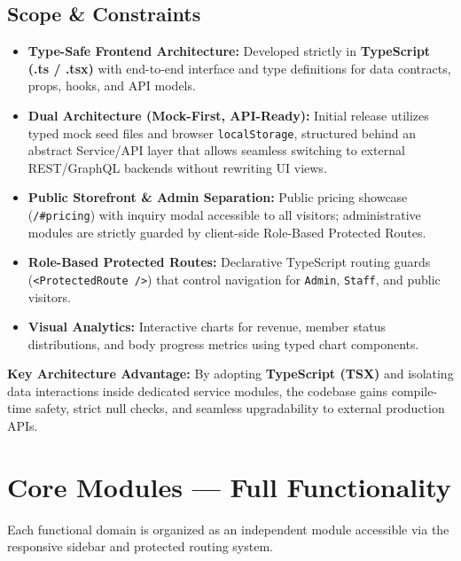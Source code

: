 \documentclass[11pt,a4paper]{article}
\newcommand{\infobox}[1]{%
\begin{tcolorbox}[
    enhanced,
    breakable,
    colback=accentorange!5,
    colframe=accentorange!40,
    boxrule=0.6pt,
    arc=1mm,
    left=10pt, right=10pt, top=8pt, bottom=8pt
]
\small #1
\end{tcolorbox}
\vspace{4pt}
}
\newcommand{\citem}{\item[\textcolor{primaryblue}{\faIcon{check}}]}
\begin{document}
\subsection*{Scope \& Constraints}
\begin{itemize}[leftmargin=*]
  \citem \textbf{Type-Safe Frontend Architecture:} Developed strictly in \textbf{TypeScript (.ts / .tsx)} with end-to-end interface and type definitions for data contracts, props, hooks, and API models.
  \citem \textbf{Dual Architecture (Mock-First, API-Ready):} Initial release utilizes typed mock seed files and browser \texttt{localStorage}, structured behind an abstract Service/API layer that allows seamless switching to external REST/GraphQL backends without rewriting UI views.
  \citem \textbf{Public Storefront \& Admin Separation:} Public pricing showcase (\texttt{/\#pricing}) with inquiry modal accessible to all visitors; administrative modules are strictly guarded by client-side Role-Based Protected Routes.
  \citem \textbf{Role-Based Protected Routes:} Declarative TypeScript routing guards (\texttt{<ProtectedRoute />}) that control navigation for \texttt{Admin}, \texttt{Staff}, and public visitors.
  \citem \textbf{Visual Analytics:} Interactive charts for revenue, member status distributions, and body progress metrics using typed chart components.
\end{itemize}

\infobox{\textbf{Key Architecture Advantage:} By adopting \textbf{TypeScript (TSX)} and isolating data interactions inside dedicated service modules, the codebase gains compile-time safety, strict null checks, and seamless upgradability to external production APIs.}

\newpage
\section{Core Modules --- Full Functionality}

Each functional domain is organized as an independent module accessible via the responsive sidebar and protected routing system.

\vspace{6pt}
\end{document}
